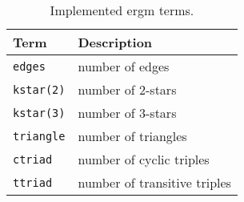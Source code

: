 \begin{table}[t]
	\centering
	\begin{tabular}{l|l}
		\toprule
		Term & Description \\
		\midrule
		\Verb"edges"    & number of edges \\
		\Verb"kstar(2)" & number of $2$-stars \\
		\Verb"kstar(3)" & number of $3$-stars \\
		\Verb"triangle" & number of triangles \\
		\Verb"ctriad"   & number of cyclic triples \\
		\Verb"ttriad"   & number of transitive triples \\
		\bottomrule
	\end{tabular}
	\caption{Implemented \acrshort{ergm} terms.}
	\label{tab:ergm-terms}
\end{table}
